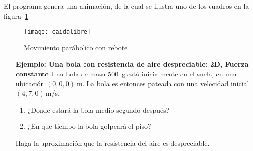 \begin{frame}
  El programa genera una animación, de la cual  se ilustra uno de los cuadros en la figura~\ref{fig:caidalibre}
  \begin{figure}
    \centering
    \texttt{[image: caidalibre]}
    \caption{Movimiento parábolico con rebote}
    \label{fig:caidalibre}
  \end{figure}

\end{frame}


\begin{itemize}
\item[\textbf{Ejemplo:}] \textbf{Una bola con resistencia de aire despreciable: 2D, Fuerza constante}
Una bola de masa 500~g está inicialmente en el suelo, en una ubicación $(0,0,0)\ $m. La bola es entonces pateada con una velocidad inicial $(4,7,0)\ $m/s.
\begin{enumerate}
\item ¿Donde estará la bola medio segundo después?
\label{item:8}
\item ¿En que tiempo la bola golpeará el piso?
\label{item:9}
\end{enumerate}
Haga la aproximación que la resistencia del aire es despreciable.



\end{itemize}
